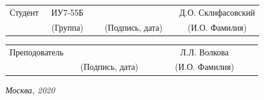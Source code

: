 \documentclass[14pt, a4paper]{extarticle}
\begin{document}
\noindent
{}
\\

\noindent
{}
\\

\vspace{1.5cm}
\noindent
\begin{tabular}{l c c c c c}
	Студент      & ~ИУ7-55Б~               & \hspace{2.5cm} & \hspace{2cm}                 & &  Д.О. Склифасовский \\\cline{2-2}\cline{4-4} \cline{6-6} 
	\hspace{3cm} & {\footnotesize(Группа)} &                & {\footnotesize(Подпись, дата)} & & {\footnotesize(И.О. Фамилия)}
\end{tabular}

\noindent
\begin{tabular}{l c c c c}
	Преподователь & \hspace{5cm}   & \hspace{2cm}                 & & ~~~~~~Л.Л. Волкова~~~~~~\\\cline{3-3} \cline{5-5} 
	\hspace{3cm}  &                & {\footnotesize(Подпись, дата)} & & {\footnotesize(И.О. Фамилия)}
\end{tabular}

\vspace{0.6cm}
\begin{center}	
	\vfill
	\large \textit {Москва, 2020}
\end{center}

\thispagestyle {empty}
\pagebreak

\clearpage
\tableofcontents

\clearpage
\end{document}
